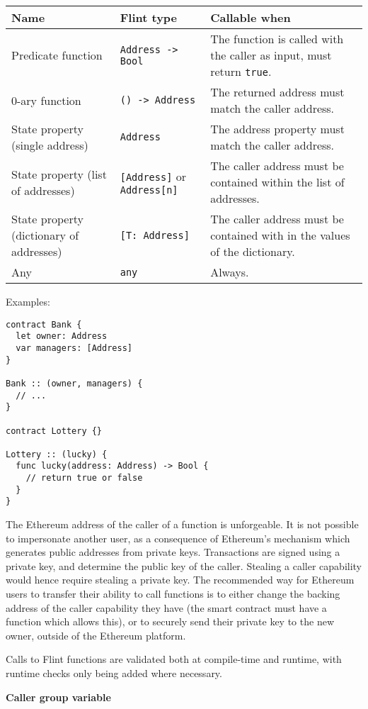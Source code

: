 \begin{tabularx}{\textwidth}{XlX}
	Name & Flint type & Callable when\\\hline
	Predicate function & \texttt{Address -> Bool} & The function is called with the caller as input, must return \texttt{true}.\\
	0-ary function & \texttt{() -> Address} & The returned address must match the caller address.\\
	State property (single address) & \texttt{Address} & The address property must match the caller address.\\
	State property (list of addresses) & \texttt{[Address]} or \texttt{Address[n]} & The caller address must be contained within the list of addresses.\\
	State property (dictionary of addresses) & \texttt{[T: Address]} & The caller address must be contained with in the values of the dictionary.\\
	Any & \texttt{any} & Always.
\end{tabularx}

Examples:

\begin{verbatim}
contract Bank {
  let owner: Address
  var managers: [Address]
}

Bank :: (owner, managers) {
  // ...
}

contract Lottery {}

Lottery :: (lucky) {
  func lucky(address: Address) -> Bool {
    // return true or false
  }
}
\end{verbatim}

The Ethereum address of the caller of a function is unforgeable. It is not possible to impersonate another user, as a consequence of Ethereum’s mechanism which generates public addresses from private keys. Transactions are signed using a private key, and determine the public key of the caller. Stealing a caller capability would hence require stealing a private key. The recommended way for Ethereum users to transfer their ability to call functions is to either change the backing address of the caller capability they have (the smart contract must have a function which allows this), or to securely send their private key to the new owner, outside of the Ethereum platform.

Calls to Flint functions are validated both at compile-time and runtime, with runtime checks only being added where necessary.

\textbf{Caller group variable}
\label{sec:appendix-b-caller-group-variable}

